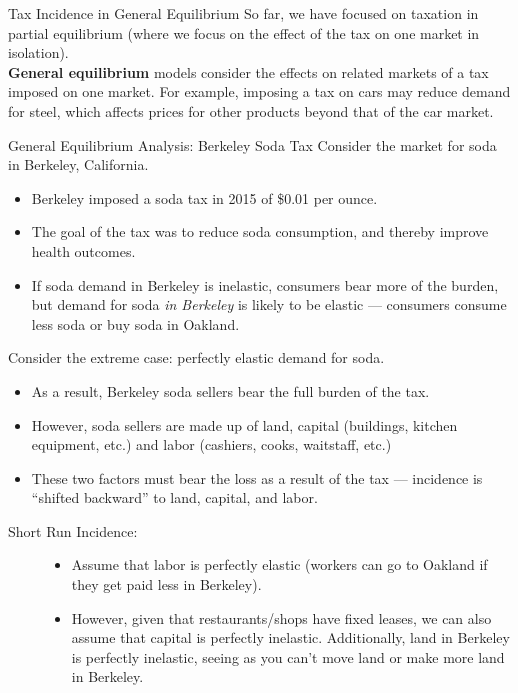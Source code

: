 \documentclass[8pt]{extarticle}
\begin{document}
  \begin{problem}{Tax Incidence in General Equilibrium}
    So far, we have focused on taxation in partial equilibrium (where we focus on the effect of the tax on one market in isolation).\\

    \textbf{General equilibrium} models consider the effects on related markets of a tax imposed on one market. For example, imposing a tax on cars may reduce demand for steel, which affects prices for other products beyond that of the car market.
  \end{problem}
  \begin{problem}{General Equilibrium Analysis: Berkeley Soda Tax}
    Consider the market for soda in Berkeley, California.
    \begin{itemize}
      \item Berkeley imposed a soda tax in 2015 of \$0.01 per ounce.
      \item The goal of the tax was to reduce soda consumption, and thereby improve health outcomes.
      \item If soda demand in Berkeley is inelastic, consumers bear more of the burden, but demand for soda \textit{in Berkeley} is likely to be elastic --- consumers consume less soda or buy soda in Oakland.
    \end{itemize}
    Consider the extreme case: perfectly elastic demand for soda.
    \begin{itemize}
      \item As a result, Berkeley soda sellers bear the full burden of the tax.
      \item However, soda sellers are made up of land, capital (buildings, kitchen equipment, etc.) and labor (cashiers, cooks, waitstaff, etc.)
      \item These two factors must bear the loss as a result of the tax --- incidence is ``shifted backward'' to land, capital, and labor.
    \end{itemize}
    \begin{description}
      \item[Short Run Incidence:]\hfill
        \begin{itemize}
          \item Assume that labor is perfectly elastic (workers can go to Oakland if they get paid less in Berkeley).
          \item However, given that restaurants/shops have fixed leases, we can also assume that capital is perfectly inelastic. Additionally, land in Berkeley is perfectly inelastic, seeing as you can't move land or make more land in Berkeley.

\end{itemize}
\end{description}
\end{problem}
\end{document}
